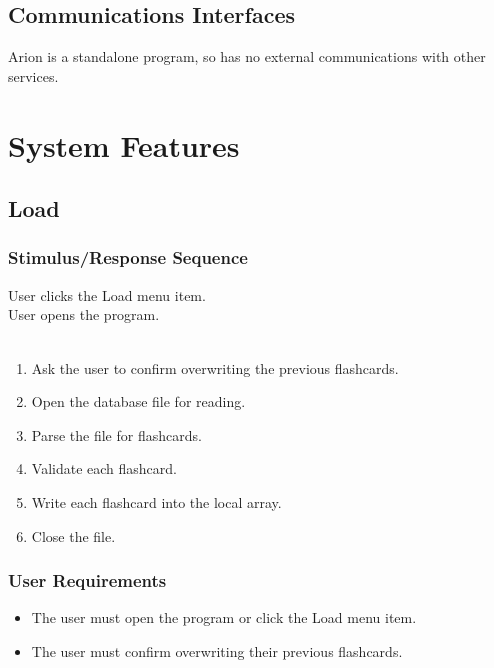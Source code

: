 \documentclass{scrreprt}
\begin{document}
\section{Communications Interfaces}
Arion is a standalone program, so has no external communications with other services.


\chapter{System Features}

\section{Load}
    \subsection{Stimulus/Response Sequence}
        \begin{flushleft}
             User clicks the Load menu item. \\
             User opens the program. \\
             \\
            \begin{enumerate}[1.]
                \item Ask the user to confirm overwriting the previous flashcards.
                \item Open the database file for reading.
                \item Parse the file for flashcards.
                \item Validate each flashcard.
                \item Write each flashcard into the local array.
                \item Close the file.
            \end{enumerate}
        \end{flushleft}

    \subsection{User Requirements}
        \begin{itemize}
            \item The user must open the program or click the Load menu item.
            \item The user must confirm overwriting their previous flashcards.
        \end{itemize}
\end{document}
